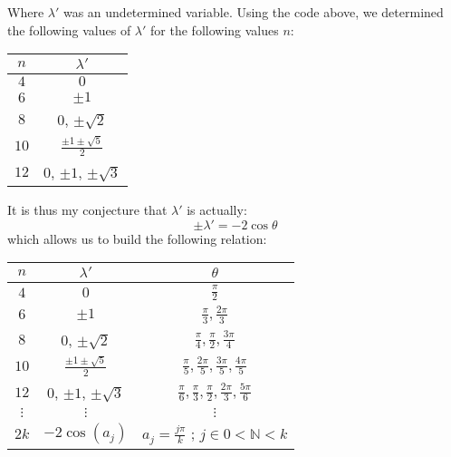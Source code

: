 \documentclass[11pt]{article}
\begin{document}
Where $\lambda'$ was an undetermined variable. Using the code above, we determined the following values of $\lambda'$ for the following values $n$:

\begin{center}
	\begin{tabular}{ c | c}
		$n$ & $\lambda'$ \\
		\hline
		$4$ & $0$ \\
		$6$ & $\pm 1$\\
		$8$ & $0$, $\pm \sqrt{2}$\\
		$10$ & $\frac{\pm 1 \pm \sqrt{5}}{2}$\\
		$12$ & $0$, $\pm 1$, $\pm \sqrt{3}$
	\end{tabular}
\end{center}

It is thus my conjecture that $\lambda'$ is actually:
\[
\pm \lambda' = -2\cos\theta
\]
which allows us to build the following relation:
\begin{center}
	\begin{tabular}{ c | c | c}
		$n$ & $\lambda'$  & $\theta$\\
		\hline
		$4$ & $0$  & $\frac{\pi}{2}$\\
		$6$ & $\pm 1$ & $\frac{\pi}{3}, \frac{2 \pi}{3}$ \\
		$8$ & $0$, $\pm \sqrt{2}$ & $\frac{\pi}{4}, \frac{\pi}{2}, \frac{3\pi}{4}$\\
		$10$ & $\frac{\pm 1 \pm \sqrt{5}}{2}$ & $\frac{\pi}{5}, \frac{2\pi}{5}, \frac{3\pi}{5},\frac{4\pi}{5}$\\
		$12$ & $0$, $\pm 1$, $\pm \sqrt{3}$ &$\frac{\pi}{6}, \frac{\pi}{3}, \frac{\pi}{2}, \frac{2\pi}{3}, \frac{5\pi}{6}$\\
		$\vdots$ & $\vdots$ & $\vdots$\\
		$2k$ & $-2\cos(a_j)$ & $a_j = \frac{j \pi}{k}$ ; $j \in 0<\mathbb{N} < k$
	\end{tabular}
\end{center}
\end{document}

